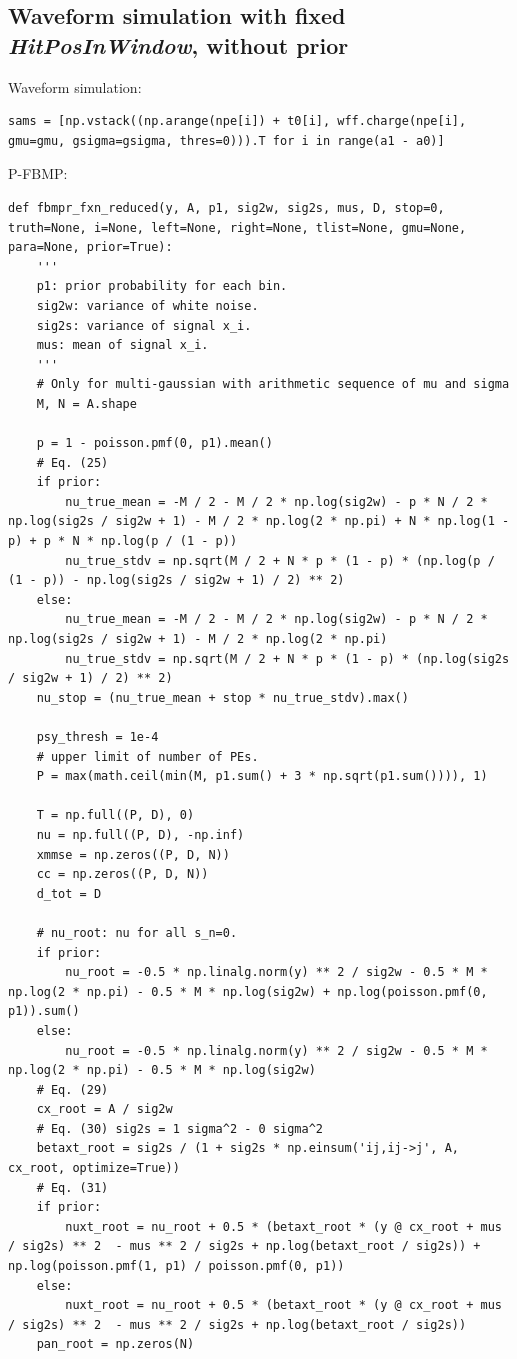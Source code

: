 \documentclass[notitlepage]{article}
\begin{document}
\subsection{Waveform simulation with fixed \textit{HitPosInWindow}, \textbf{without} prior}

Waveform simulation:

\begin{lstlisting}
sams = [np.vstack((np.arange(npe[i]) + t0[i], wff.charge(npe[i], gmu=gmu, gsigma=gsigma, thres=0))).T for i in range(a1 - a0)]
\end{lstlisting}

P-FBMP:

\begin{lstlisting}
def fbmpr_fxn_reduced(y, A, p1, sig2w, sig2s, mus, D, stop=0, truth=None, i=None, left=None, right=None, tlist=None, gmu=None, para=None, prior=True):
    '''
    p1: prior probability for each bin.
    sig2w: variance of white noise.
    sig2s: variance of signal x_i.
    mus: mean of signal x_i.
    '''
    # Only for multi-gaussian with arithmetic sequence of mu and sigma
    M, N = A.shape

    p = 1 - poisson.pmf(0, p1).mean()
    # Eq. (25)
    if prior:
        nu_true_mean = -M / 2 - M / 2 * np.log(sig2w) - p * N / 2 * np.log(sig2s / sig2w + 1) - M / 2 * np.log(2 * np.pi) + N * np.log(1 - p) + p * N * np.log(p / (1 - p))
        nu_true_stdv = np.sqrt(M / 2 + N * p * (1 - p) * (np.log(p / (1 - p)) - np.log(sig2s / sig2w + 1) / 2) ** 2)
    else:
        nu_true_mean = -M / 2 - M / 2 * np.log(sig2w) - p * N / 2 * np.log(sig2s / sig2w + 1) - M / 2 * np.log(2 * np.pi)
        nu_true_stdv = np.sqrt(M / 2 + N * p * (1 - p) * (np.log(sig2s / sig2w + 1) / 2) ** 2)
    nu_stop = (nu_true_mean + stop * nu_true_stdv).max()

    psy_thresh = 1e-4
    # upper limit of number of PEs.
    P = max(math.ceil(min(M, p1.sum() + 3 * np.sqrt(p1.sum()))), 1)

    T = np.full((P, D), 0)
    nu = np.full((P, D), -np.inf)
    xmmse = np.zeros((P, D, N))
    cc = np.zeros((P, D, N))
    d_tot = D

    # nu_root: nu for all s_n=0.
    if prior:
        nu_root = -0.5 * np.linalg.norm(y) ** 2 / sig2w - 0.5 * M * np.log(2 * np.pi) - 0.5 * M * np.log(sig2w) + np.log(poisson.pmf(0, p1)).sum()
    else:
        nu_root = -0.5 * np.linalg.norm(y) ** 2 / sig2w - 0.5 * M * np.log(2 * np.pi) - 0.5 * M * np.log(sig2w)
    # Eq. (29)
    cx_root = A / sig2w
    # Eq. (30) sig2s = 1 sigma^2 - 0 sigma^2
    betaxt_root = sig2s / (1 + sig2s * np.einsum('ij,ij->j', A, cx_root, optimize=True))
    # Eq. (31)
    if prior:
        nuxt_root = nu_root + 0.5 * (betaxt_root * (y @ cx_root + mus / sig2s) ** 2  - mus ** 2 / sig2s + np.log(betaxt_root / sig2s)) + np.log(poisson.pmf(1, p1) / poisson.pmf(0, p1))
    else:
        nuxt_root = nu_root + 0.5 * (betaxt_root * (y @ cx_root + mus / sig2s) ** 2  - mus ** 2 / sig2s + np.log(betaxt_root / sig2s))
    pan_root = np.zeros(N)


\end{lstlisting}
\end{document}
